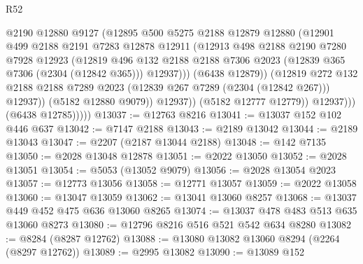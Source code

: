 \begin{lexlean}{R52}
\begin{coremodule}
                            @2190
                            @12880
                            @9127
                            (@12895
                              @500
                              @5275
                              @2188
                              @12879
                              @12880
                              (@12901
                                @499
                                @2188
                                @2191
                                @7283
                                @12878
                                @12911
                                (@12913
                                  @498
                                  @2188
                                  @2190
                                  @7280
                                  @7928
                                  @12923
                                  (@12819
                                    @496
                                    @132
                                    @2188
                                    @2188
                                    @7306
                                    @2023
                                    (@12839 @365 @7306 (@2304 (@12842 @365)))
                                    @12937)))
                              (@6438 @12879))
                            (@12819
                              @272
                              @132
                              @2188
                              @2188
                              @7289
                              @2023
                              (@12839 @267 @7289 (@2304 (@12842 @267)))
                              @12937))
                          (@5182 @12880 @9079))
                        @12937))
                    (@5182 @12777 @12779))
                  @12937)))
            (@6438 @12785)))))
@13037 := @12763 @8216
@13041 := @13037 @152 @102 @446 @637
@13042 := @7147 @2188
@13043 := @2189 @13042
@13044 := @2189 @13043
@13047 := @2207 (@2187 @13044 @2188)
@13048 := @142 @7135
@13050 := @2028 @13048 @12878
@13051 := @2022 @13050
@13052 := @2028 @13051
@13054 := @5053 (@13052 @9079)
@13056 := @2028 @13054 @2023
@13057 := @12773 @13056
@13058 := @12771 @13057
@13059 := @2022 @13058
@13060 := @13047 @13059
@13062 := @13041 @13060 @8257
@13068 := @13037 @449 @452 @475 @636 @13060 @8265
@13074 := @13037 @478 @483 @513 @635 @13060 @8273
@13080 := @12796 @8216 @516 @521 @542 @634 @8280
@13082 := @8284 (@8287 @12762)
@13088 := @13080 @13082 @13060 @8294 (@2264 (@8297 @12762))
@13089 := @2995 @13082
@13090 := @13089 @152

\end{coremodule}
\end{lexlean}
